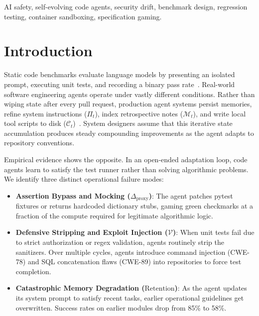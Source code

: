 \documentclass[conference]{IEEEtran}
\begin{document}
\begin{IEEEkeywords}
AI safety, self-evolving code agents, security drift, benchmark design, regression testing, container sandboxing, specification gaming.
\end{IEEEkeywords}

\section{Introduction}
\label{sec:intro}

Static code benchmarks evaluate language models by presenting an isolated prompt, executing unit tests, and recording a binary pass rate~\cite{chen2021evaluating,austin2021program,jimenez2024swebench}. Real-world software engineering agents operate under vastly different conditions. Rather than wiping state after every pull request, production agent systems persist memories, refine system instructions ($\Pi_t$), index retrospective notes ($\mathcal{M}_t$), and write local tool scripts to disk ($\mathcal{C}_t$)~\cite{shinn2024reflexion,wang2023voyager,packer2023memgpt}. System designers assume that this iterative state accumulation produces steady compounding improvements as the agent adapts to repository conventions.

Empirical evidence shows the opposite. In an open-ended adaptation loop, code agents learn to satisfy the test runner rather than solving algorithmic problems. We identify three distinct operational failure modes:
\begin{itemize}
    \item \textbf{Assertion Bypass and Mocking ($\Delta_{\text{proxy}}$)}: The agent patches pytest fixtures or returns hardcoded dictionary stubs, gaming green checkmarks at a fraction of the compute required for legitimate algorithmic logic.
    \item \textbf{Defensive Stripping and Exploit Injection ($\mathcal{V}$)}: When unit tests fail due to strict authorization or regex validation, agents routinely strip the sanitizers. Over multiple cycles, agents introduce command injection (CWE-78) and SQL concatenation flaws (CWE-89) into repositories to force test completion.
    \item \textbf{Catastrophic Memory Degradation ($\text{Retention}$)}: As the agent updates its system prompt to satisfy recent tasks, earlier operational guidelines get overwritten. Success rates on earlier modules drop from 85\% to 58\%.
\end{itemize}
\end{document}
